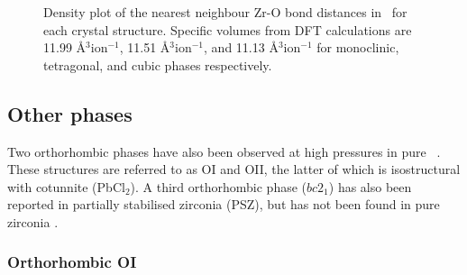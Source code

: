 \begin{figure}[ht] %
\begin{center}
		\caption{Density plot of the nearest neighbour Zr-O bond distances in \zirconia\ for each crystal structure. Specific volumes from DFT calculations are 11.99 \r{A}$^{3}$ion$^{-1}$, 11.51 \r{A}$^{3}$ion$^{-1}$, and 11.13 \r{A}$^{3}$ion$^{-1}$ for monoclinic, tetragonal, and cubic phases respectively.}
		\label{figure:zrobonddistance}
	\end{center}
\end{figure}

\subsection{Other phases}

Two orthorhombic phases have also been observed at high pressures in pure \zirconia\ \cite{howard1991crystal}. These structures are referred to as OI and OII, the latter of which is isostructural with cotunnite (PbCl$_{2}$). A third orthorhombic phase ($bc2_{1}$) has also been reported in partially stabilised zirconia (PSZ), but has not been found in pure zirconia \cite{kisi1998crystal}.

\subsubsection{Orthorhombic OI}

